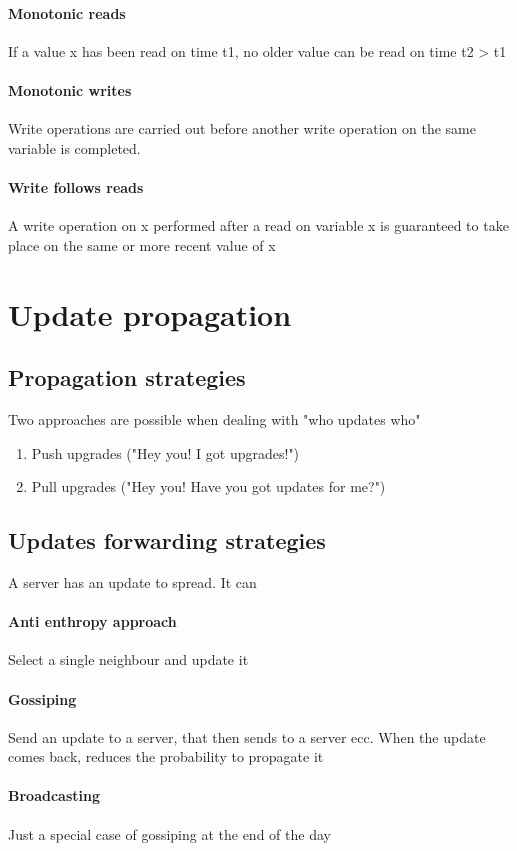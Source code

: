 \documentclass[10pt,a4paper]{article}
\begin{document}
					\paragraph{Monotonic reads}
						If a value x has been read on time t1, no older value can be read on time t2 > t1					
					\paragraph{Monotonic writes}
						Write operations are carried out before another write operation on the same variable is completed.
					\paragraph{Write follows reads}
						A write operation on x performed after a read on variable x is guaranteed to take place on the same or more recent value of x
		\section{Update propagation}
			\subsection{Propagation strategies}
				Two approaches are possible when dealing with "who updates who"
				\begin{enumerate}
					\item Push upgrades ("Hey you! I got upgrades!")
					\item Pull upgrades ("Hey you! Have you got updates for me?")
				\end{enumerate}
				
			\subsection{Updates forwarding strategies}
				A server has an update to spread. It can
				\paragraph{Anti enthropy approach}
					Select a single neighbour and update it
				\paragraph{Gossiping}
					Send an update to a server, that then sends to a server ecc. When the update comes back, reduces the probability to propagate it
				\paragraph{Broadcasting}
					Just a special case of gossiping at the end of the day
	
\end{document}
